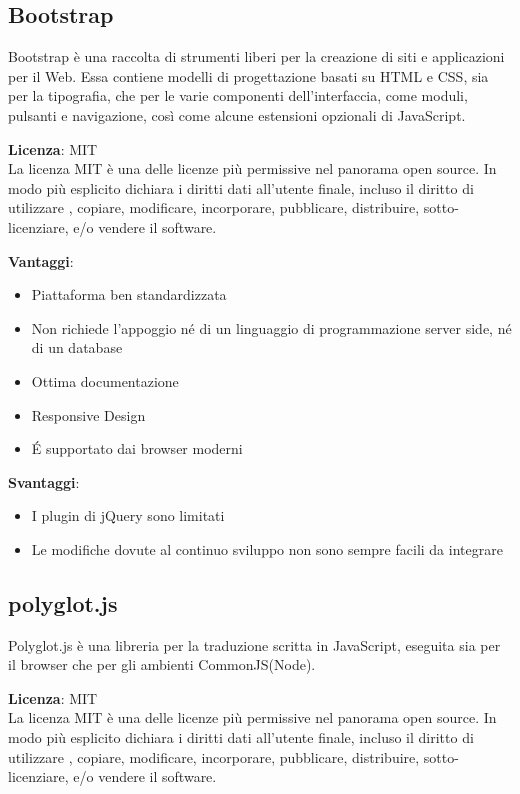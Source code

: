 \subsection{Bootstrap}

Bootstrap è una raccolta di strumenti liberi per la creazione di siti e applicazioni per il Web. Essa contiene modelli di progettazione basati su HTML e CSS, sia per la tipografia, che per le varie componenti dell'interfaccia, come moduli, pulsanti e navigazione, così come alcune estensioni opzionali di JavaScript.

\textbf{Licenza}: MIT \\
La licenza MIT è una delle licenze più permissive nel panorama open source. In modo più esplicito dichiara i diritti dati all'utente finale, incluso il diritto di utilizzare , copiare, modificare, incorporare, pubblicare, distribuire, sotto-licenziare, e/o vendere il software.

\textbf{Vantaggi}: 
\begin{itemize}
	
	\item Piattaforma ben standardizzata 
	\item Non richiede l’appoggio né di un linguaggio di programmazione server side, né di un database
	\item Ottima documentazione
	\item Responsive Design	
	\item \'E supportato dai browser moderni
	
\end{itemize}

\textbf{Svantaggi}: 
\begin{itemize}
	\item I plugin di jQuery sono limitati
	\item Le modifiche dovute al continuo sviluppo non sono sempre facili da integrare
\end{itemize}



\subsection{polyglot.js}
Polyglot.js è una libreria per la traduzione scritta in JavaScript, eseguita sia per il browser che per gli ambienti CommonJS(Node).

\textbf{Licenza}: MIT \\
La licenza MIT è una delle licenze più permissive nel panorama open source. In modo più esplicito dichiara i diritti dati all'utente finale, incluso il diritto di utilizzare , copiare, modificare, incorporare, pubblicare, distribuire, sotto-licenziare, e/o vendere il software.

